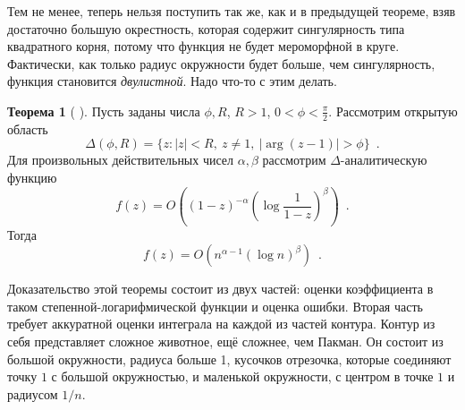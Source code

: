 \documentclass[a5paper]{article}
\theoremstyle{definition}
\newtheorem*{theorem}{Теорема}
\begin{document}
Тем не менее, теперь нельзя поступить так же, как и в предыдущей теореме, взяв
достаточно большую окрестность, которая содержит сингулярность типа квадратного
корня, потому что функция не будет мероморфной в круге. Фактически, как только
радиус окружности будет больше, чем сингулярность, функция становится
\textit{двулистной}. Надо что-то с этим делать.
\begin{theorem}[ {\cite[Theorem VI.3, page 390]{ac}}]
    Пусть заданы числа \( \phi, R \), \( R > 1 \), \( 0 < \phi < \tfrac{\pi}{2}
\). Рассмотрим открытую область
\begin{equation}
    \Delta(\phi, R) = \{
        z \colon
        |z| < R, \ 
        z \neq 1, \ 
        | \arg(z-1) | > \phi
    \}
    \enspace .
\end{equation}
Для произвольных действительных чисел \( \alpha, \beta \) рассмотрим \( \Delta
\)-аналитическую функцию
\begin{equation}
    f(z) = O \left(
         (1-z)^{-\alpha} \left(
            \log \dfrac{1}{1 -z}
         \right)^\beta
    \right)
    \enspace .
\end{equation}
Тогда
\begin{equation}
    [z^n]f(z) = O( n^{\alpha - 1} (\log n)^\beta )
    \enspace .
\end{equation}
\end{theorem}
Доказательство этой теоремы состоит из двух частей: оценки коэффициента в таком
степенной-логарифмической функции и оценка ошибки. Вторая часть требует
аккуратной оценки интеграла на каждой из частей контура. Контур из себя
представляет сложное животное, ещё сложнее, чем Пакман. Он состоит из большой
окружности, радиуса больше 1, кусочков отрезочка, которые соединяют точку \( 1
\) с большой окружностью, и маленькой окружности, с центром в точке \( 1 \) и
радиусом \( 1/n \).
\end{document}

